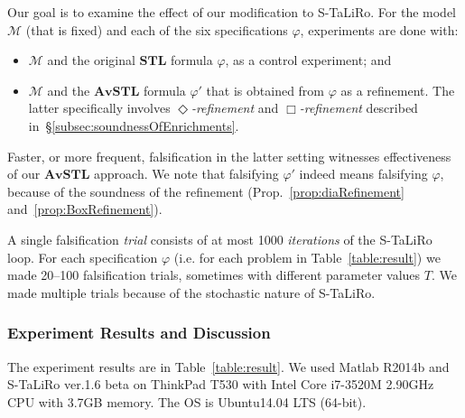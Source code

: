 \documentclass[envcountsect,orivec]{llncs} \usepackage{etex} \usepackage[]{graphicx}
\newcommand{\STL}{\textbf{STL}}
\newcommand{\AvSTL}{\textbf{AvSTL}}
\begin{document}
Our goal is to examine the effect of our modification to S-TaLiRo.
For the  model $\mathcal{M}$ (that is fixed) and each of the six specifications
$\varphi$, experiments are done with:
\begin{itemize}
 \item $\mathcal{M}$ and the original $\STL$ formula $\varphi$, as a
       control experiment;
       and
 \item $\mathcal{M}$ and the $\AvSTL$ formula $\varphi'$ that is
       obtained from $\varphi$ as a
       refinement. The latter specifically involves \emph{$\Diamond$-refinement} and
       \emph{$\Box$-refinement} described in~\S{}\ref{subsec:soundnessOfEnrichments}.
\end{itemize}
Faster, or more frequent, falsification in the latter setting witnesses
effectiveness of our $\AvSTL$ approach. We note that
falsifying $\varphi'$ indeed means falsifying $\varphi$, because of the
soundness of the refinement (Prop.~\ref{prop:diaRefinement} and~\ref{prop:BoxRefinement}).

A single falsification \emph{trial} consists of at most 1000 \emph{iterations} of the S-TaLiRo
loop. For each specification $\varphi$ (i.e. for each problem in
Table~\ref{table:result}) we made 
20--100 falsification trials, 
sometimes
with different parameter values $T$. We made multiple trials
because of the stochastic nature of S-TaLiRo.












































\subsubsection{Experiment Results and Discussion}
The experiment results are in Table~\ref{table:result}.
We used
Matlab R2014b and
S-TaLiRo ver.1.6 beta
on
ThinkPad T530 with Intel Core i7-3520M 2.90GHz CPU with 3.7GB memory.
The OS is Ubuntu14.04 LTS (64-bit).
\end{document}
